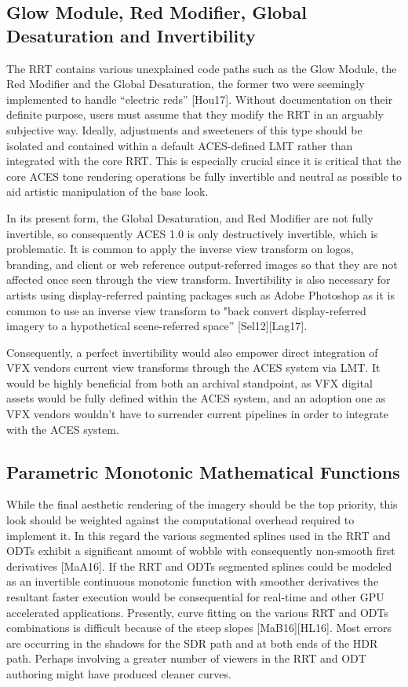 \documentclass[conference]{IEEEtran}
\begin{document}
\subsection{Glow Module, Red Modifier, Global Desaturation and Invertibility}
The RRT contains various unexplained code paths such as the Glow Module, the Red Modifier and the Global Desaturation, the former two were seemingly implemented to handle “electric reds” [Hou17]. Without documentation on their definite purpose, users must assume that they modify the RRT in an arguably subjective way. Ideally, adjustments and sweeteners of this type should be isolated and contained within a default ACES-defined LMT rather than integrated with the core RRT. This is especially crucial since it is critical that the core ACES tone rendering operations be fully invertible and neutral as possible to aid artistic manipulation of the base look.

In its present form, the Global Desaturation, and Red Modifier are not fully invertible, so consequently ACES 1.0 is only destructively invertible, which is problematic. It is common to apply the inverse view transform on logos, branding, and client or web reference output-referred images so that they are not affected once seen through the view transform. Invertibility is also necessary for artists using display-referred painting packages such as Adobe Photoshop as it is common to use an inverse view transform to "back convert display-referred imagery to a hypothetical scene-referred space” [Sel12][Lag17].

Consequently, a perfect invertibility would also empower direct integration of VFX vendors current view transforms through the ACES system via LMT. It would be highly beneficial from both an archival standpoint, as VFX digital assets would be fully defined within the ACES system, and an adoption one as VFX vendors wouldn't have to surrender current pipelines in order to integrate with the ACES system.

\subsection{Parametric Monotonic Mathematical Functions}
While the final aesthetic rendering of the imagery should be the top priority, this look should be weighted against the computational overhead required to implement it. In this regard the various segmented splines used in the RRT and ODTs exhibit a significant amount of wobble with consequently non-smooth first derivatives [MaA16]. If the RRT and ODTs segmented splines could be modeled as an invertible continuous monotonic function with smoother derivatives the resultant faster execution would be consequential for real-time and other GPU accelerated applications. Presently, curve fitting on the various RRT and ODTs combinations is difficult because of the steep slopes [MaB16][HL16]. Most errors are occurring in the shadows for the SDR path and at both ends of the HDR path. Perhaps involving a greater number of viewers in the RRT and ODT authoring might have produced cleaner curves.
\end{document}
